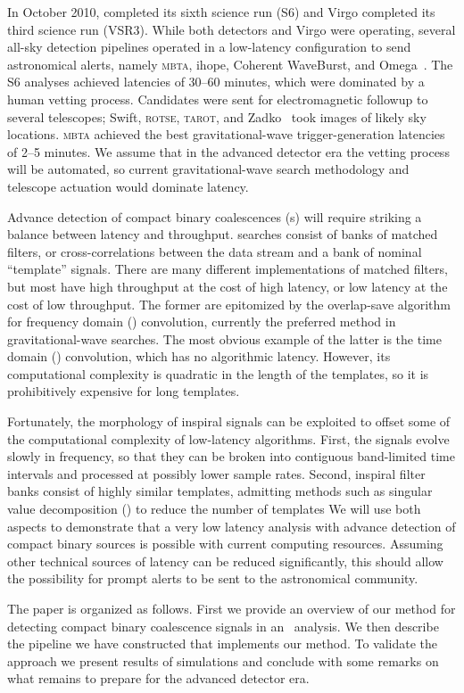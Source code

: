 In October 2010, \LIGO{} completed its sixth science run
(S6) and Virgo completed its third science run (VSR3).  While both
\LIGO{} detectors and Virgo were operating, several all-sky detection
pipelines operated in a low-latency configuration to send astronomical alerts,
namely \textsc{mbta}, ihope,
Coherent WaveBurst, and Omega~\cite{HugheyGWPAW2011, S6lowlatency}.
 The S6 analyses
achieved latencies of 30--60 minutes, which were dominated by a human vetting
process. Candidates were sent for electromagnetic followup to several
telescopes; Swift, \textsc{rotse}, \textsc{tarot}, and Zadko~\cite{kanner2008,
HugheyGWPAW2011} took images of likely sky locations.  \textsc{mbta} achieved
the best gravitational-wave trigger-generation latencies of 2--5 minutes.  We
assume that in the advanced detector era the vetting process will be automated,
so current gravitational-wave search methodology and telescope actuation would
dominate latency.

Advance detection of compact binary coalescences (\CBC{}s) will require striking a balance between latency
and throughput.  \CBC{} searches consist of banks of matched filters, or
cross-correlations between the data stream and a bank of nominal ``template''
signals.  There are many different implementations of matched filters, but most
have high throughput at the cost of high latency, or low latency at the cost of
low throughput.  The former are epitomized by the overlap-save algorithm
\cite{numerical-recipes-chapter-13} for frequency domain (\FD) convolution,
currently the preferred method in gravitational-wave
searches.  The most obvious example of the latter is the time domain
(\TD) convolution, which has no algorithmic latency.  However, its
computational complexity is quadratic in the length of the templates, so it is
prohibitively expensive for long templates.

Fortunately, the morphology of inspiral signals can be exploited to offset some
of the computational complexity of low-latency algorithms.  First, the signals
evolve slowly in frequency, so that they can be broken into contiguous
band-limited time intervals and processed at possibly lower sample rates.
Second, inspiral filter banks consist of highly similar templates, admitting
methods such as singular value decomposition (\SVD{}) to reduce the number of templates\cite{Cannon:2010p10398}
We will use both aspects to demonstrate that a very
low latency analysis with advance detection of compact binary sources is
possible with current computing resources.  Assuming other technical sources of
latency can be reduced significantly, this should allow the possibility for
prompt alerts to be sent to the astronomical community.

The paper is organized as follows. First we provide an overview of our method
for detecting compact binary coalescence signals in an \earlywarning\ analysis.
We then describe the pipeline we have constructed that implements our method.
To validate the approach we present results of simulations and conclude with
some remarks on what remains to prepare for the advanced detector era.

